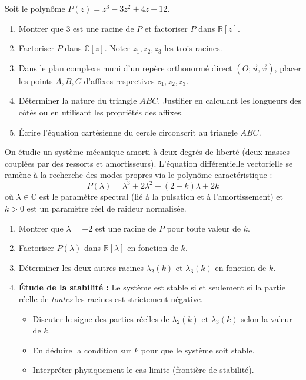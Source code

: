 \documentclass[11pt]{article}
\begin{document}
\begin{exercice}
Soit le polynôme $P(z) = z^3 - 3z^2 + 4z - 12$.
\begin{enumerate}
\item Montrer que $3$ est une racine de $P$ et factoriser $P$ dans $\mathbb{R}[z]$.
\item Factoriser $P$ dans $\mathbb{C}[z]$. Noter $z_1, z_2, z_3$ les trois racines.
\item Dans le plan complexe muni d'un repère orthonormé direct $(O; \vec{u}, \vec{v})$, placer les points $A, B, C$ d'affixes respectives $z_1, z_2, z_3$.
\item Déterminer la nature du triangle $ABC$. Justifier en calculant les longueurs des côtés ou en utilisant les propriétés des affixes.
\item Écrire l'équation cartésienne du cercle circonscrit au triangle $ABC$.
\end{enumerate}
\end{exercice}

\begin{exercice}
On étudie un système mécanique amorti à deux degrés de liberté (deux masses couplées par des ressorts et amortisseurs). L'équation différentielle vectorielle se ramène à la recherche des modes propres via le polynôme caractéristique :
\[ P(\lambda) = \lambda^3 + 2\lambda^2 + (2+k)\lambda + 2k \]
où $\lambda \in \mathbb{C}$ est le paramètre spectral (lié à la pulsation et à l'amortissement) et $k > 0$ est un paramètre réel de raideur normalisée.
\begin{enumerate}
\item Montrer que $\lambda = -2$ est une racine de $P$ pour toute valeur de $k$.
\item Factoriser $P(\lambda)$ dans $\mathbb{R}[\lambda]$ en fonction de $k$.
\item Déterminer les deux autres racines $\lambda_2(k)$ et $\lambda_3(k)$ en fonction de $k$.
\item \textbf{Étude de la stabilité :} Le système est stable si et seulement si la partie réelle de \emph{toutes} les racines est strictement négative.
\begin{itemize}
\item Discuter le signe des parties réelles de $\lambda_2(k)$ et $\lambda_3(k)$ selon la valeur de $k$.
\item En déduire la condition sur $k$ pour que le système soit stable.
\item Interpréter physiquement le cas limite (frontière de stabilité).
\end{itemize}
\end{enumerate}
\end{exercice}
\end{document}

